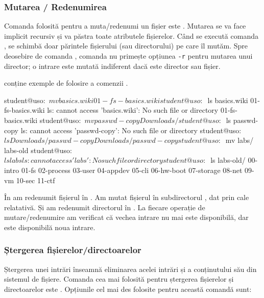 \subsubsection{Mutarea / Redenumirea}
\label{sec:fs:mv}

Comanda folosită pentru a muta/redenumi un fișier este .
Mutarea se va face implicit recursiv și va păstra toate atributele fișierelor.
Când se execută comanda , se schimbă doar părintele fișierului (sau directorului) pe care îl mutăm.
Spre deosebire de comanda , comanda  nu primește opțiunea \texttt{-r} pentru mutarea unui director;
o intrare este mutată indiferent dacă este director sau fișier.

 conține exemple de folosire a comenzii .

\begin{screen}[caption={Mutarea / Redenumirea fișierelor și directoarelor},label={lst:fs:mv}]
student@uso:~$ mv basics.wiki 01-fs-basics.wiki
student@uso:~$ ls basics.wiki 01-fs-basics.wiki
ls: cannot access 'basics.wiki': No such file or directory
01-fs-basics.wiki
student@uso:~$ mv passwd-copy Downloads/
student@uso:~$ ls passwd-copy
ls: cannot access 'passwd-copy': No such file or directory
student@uso:~$ ls Downloads/passwd-copy
Downloads/passwd-copy
student@uso:~$ mv labs/ labs-old
student@uso:~$ ls labs
ls: cannot access 'labs': No such file or directory
student@uso:~$ ls labs-old/
00-intro  01-fs  02-process  03-user  04-appdev  05-cli  06-hw-boot  07-storage  08-net  09-vm  10-sec  11-ctf
\end{screen}

În  am redenumit fișierul  în .
Am mutat fișierul  în subdirectorul , dat prin cale relatativă.
Și am redenumit directorul  în .
La fiecare operație de mutare/redenumire am verificat că vechea intrare nu mai este disponibilă, dar este disponibilă noua intrare.

\subsubsection{Ștergerea fișierelor/directoarelor}
\label{sec:fs:rm}

Ștergerea unei intrări înseamnă eliminarea acelei intrări și a conținutului său din sistemul de fișiere.
Comanda cea mai folosită pentru ștergerea fișierelor și directoarelor este
.
Opțiunile cel mai des folosite pentru această comandă sunt:

